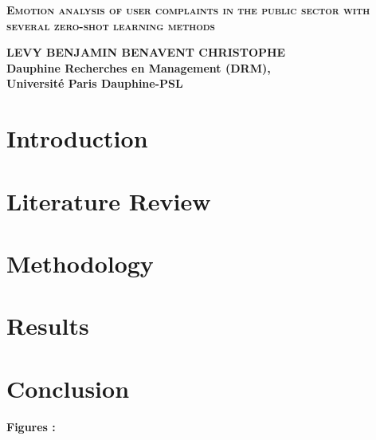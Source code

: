 \documentclass[a4paper,12pt]{article}
\begin{document}
\begin{titlepage}

\vspace*{3cm}

\begin{center}
\textbf{\textsc{Emotion analysis of user complaints in the public sector with several zero-shot learning methods} }
\end{center}

\vspace{3cm}

\begin{center}
\hspace{3cm}
\textbf{LEVY BENJAMIN \hfill BENAVENT CHRISTOPHE} \hspace*{3cm} \\ \medskip
     \textbf{Dauphine Recherches en Management  (DRM),\\
      Université Paris Dauphine-PSL
}
\end{center}

\vspace{1cm}
\end{titlepage}


\section{Introduction}
\section{Literature Review}
\section{Methodology}
\section{Results}
\section{Conclusion}


\clearpage
\newpage

\printbibliography

\break
\noindent\textbf{Figures :}
\end{document}
